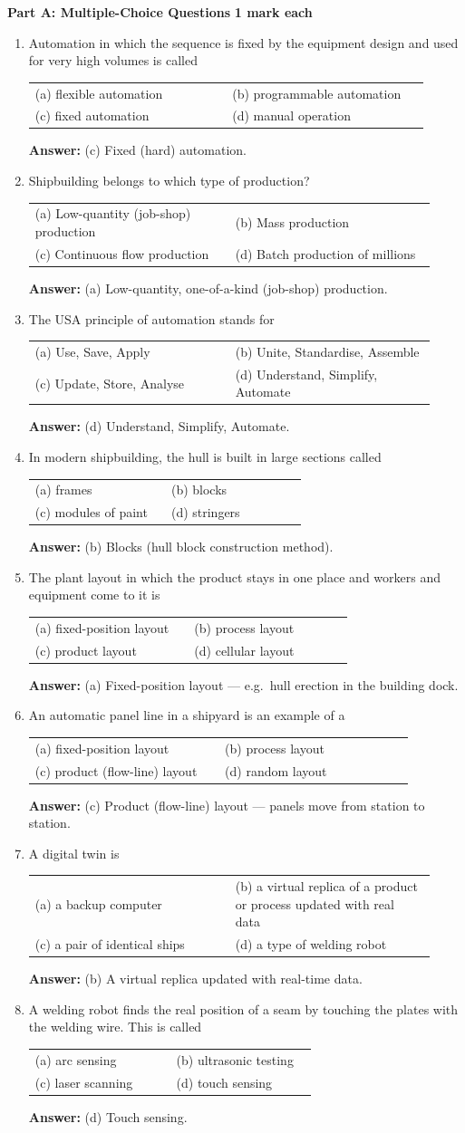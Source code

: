 \documentclass[11pt,a4paper]{article}
\makeatletter
\newcommand{\opts}[4]{%
	\par\smallskip
	\begin{tabular}{@{}p{0.46\linewidth}p{0.46\linewidth}@{}}
		(a) #1 & (b) #2 \\
		(c) #3 & (d) #4 \\
	\end{tabular}\par}
\newcommand{\ans}[1]{%
	\par\smallskip
	{\color{cGreen!50!black}\textbf{Answer:} #1}\par\medskip}
\newcommand{\partheading}[2]{%
	\bigskip
	\begin{tcolorbox}[colback=cAccent!10, colframe=cAccent, boxrule=0.6pt, arc=2pt, left=6pt, top=3pt, bottom=3pt]
		\textbf{\large #1} \hfill \textbf{#2}
	\end{tcolorbox}}
\makeatother
\begin{document}
	\partheading{Part A: Multiple-Choice Questions}{1 mark each}
	\begin{enumerate}

		\item Automation in which the sequence is fixed by the equipment design and used for very high volumes is called
		\opts{flexible automation}{programmable automation}{fixed automation}{manual operation}
		\ans{(c) Fixed (hard) automation.}

		\item Shipbuilding belongs to which type of production?
		\opts{Low-quantity (job-shop) production}{Mass production}{Continuous flow production}{Batch production of millions}
		\ans{(a) Low-quantity, one-of-a-kind (job-shop) production.}

		\item The USA principle of automation stands for
		\opts{Use, Save, Apply}{Unite, Standardise, Assemble}{Update, Store, Analyse}{Understand, Simplify, Automate}
		\ans{(d) Understand, Simplify, Automate.}

		\item In modern shipbuilding, the hull is built in large sections called
		\opts{frames}{blocks}{modules of paint}{stringers}
		\ans{(b) Blocks (hull block construction method).}

		\item The plant layout in which the product stays in one place and workers and equipment come to it is
		\opts{fixed-position layout}{process layout}{product layout}{cellular layout}
		\ans{(a) Fixed-position layout --- e.g.\ hull erection in the building dock.}

		\item An automatic panel line in a shipyard is an example of a
		\opts{fixed-position layout}{process layout}{product (flow-line) layout}{random layout}
		\ans{(c) Product (flow-line) layout --- panels move from station to station.}

		\item A digital twin is
		\opts{a backup computer}{a virtual replica of a product or process updated with real data}{a pair of identical ships}{a type of welding robot}
		\ans{(b) A virtual replica updated with real-time data.}

		\item A welding robot finds the real position of a seam by touching the plates with the welding wire. This is called
		\opts{arc sensing}{ultrasonic testing}{laser scanning}{touch sensing}
		\ans{(d) Touch sensing.}


\end{enumerate}
\end{document}
